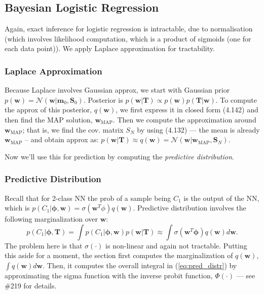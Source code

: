 \documentclass[a4paper]{article}
\newcommand{\mb}{\mathbf}
\newcommand{\bs}{\boldsymbol}
\begin{document}
\subsection{Bayesian Logistic Regression}
Again, exact inference for logistic regression is intractable, due to normalisation (which involves likelihood computation, which is a product of sigmoids (one for each data point)). We apply Laplace approximation for tractability.

\subsubsection{Laplace Approximation}
Because Laplace involves Gaussian approx, we start with Gaussian prior $p(\mb{w}) = \mathcal{N}(\mb{w}|\mb{m}_0,\mb{S}_0)$. Posterior is $p(\mb{w}|\mb{T})\propto p(\mb{w})p(\mb{T|w})$. To compute the approx of this posterior, $q(\mb{w})$, we first express it in closed form (4.142) and then find the MAP solution, $\mb{w}_{\text{MAP}}$. Then we compute the approximation around $\mb{w}_{\text{MAP}}$; that is, we find the cov. matrix $S_N$ by using (4.132) \---- the mean is already $\mb{w}_{\text{MAP}}$ \--- and obtain approx as: $p(\mb{w|T})\approx q(\mb{w}) = \mathcal{N}(\mb{w}|\mb{w}_{\text{MAP}}, \mb{S}_N)$.

Now we'll use this for prediction by computing the \textit{predictive distribution}.

\subsubsection{Predictive Distribution}
Recall that for 2-class NN the prob of a sample being $C_1$ is the output of the NN, which is $p(C_1|\bs{\phi},\mb{w})=\sigma(\mb{w}^T\phi)q(\mb{w})$. Predictive distribution involves the following marginalization over $\mb{w}$:
%
\begin{equation}
p(C_1|\bs{\phi},\mb{T})=\int p(C_1|\bs{\phi},\mb{w}) p (\mb{w}|\mb{T}) \approx \int \sigma (\mb{w}^{T}\bs{\phi})q(\mb{w})d\mb{w}.
\label{eq:pred_distr}
\end{equation}
%
The problem here is that $\sigma(\cdot)$ is non-linear and again not tractable. Putting this aside for a moment, the section first computes the marginalization of $q(\mb{w})$, $\int q(\mb{w})d\mb{w}$. Then, it computes the overall integral in (\ref{eq:pred_distr}) by approximating the sigma function with the inverse probit function, $\Phi(\cdot)$ \---- see \#219 for details.

 
\clearpage
\newpage
\end{document}
